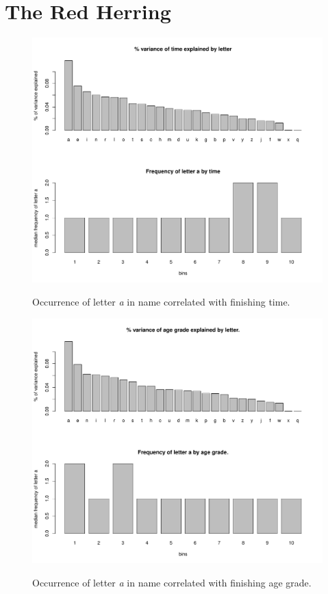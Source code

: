 \documentclass{tufte-book} %
\begin{document}
\section{The Red Herring}
\begin{figure}
	\centering
	\includegraphics{graphics/plot-letter-a-time}
	\label{img:plot-letter-a-time}
	\caption{Occurrence of letter {\em a} in name correlated with finishing time.}
\end{figure}

\begin{figure}
	\centering
	\includegraphics{graphics/plot-letter-a-agegrade}
	\label{img:plot-letter-a-agegrade}
	\caption{Occurrence of letter {\em a} in name correlated with finishing age grade.}
\end{figure}
\backmatter
\end{document}
